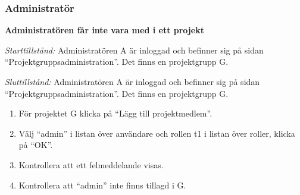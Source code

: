 \documentclass[a4paper]{article}
\begin{document}
\subsubsection{Administratör}
\begin{FT}
\item \textbf{Administratören får inte vara med i ett projekt}

\emph{Starttillstånd:} Administratören A är inloggad och befinner sig på sidan ``Projektgruppsadministration''. Det finns en projektgrupp G.

\emph{Sluttillstånd:} Administratören A är inloggad och befinner sig på sidan ``Projektgruppsadministration''. Det finns en projektgrupp G.

\begin{enumerate}
\item För projektet G klicka på ``Lägg till projektmedlem''.
\item Välj ``admin'' i listan över användare och rollen t1 i listan över roller, klicka på ``OK''.
\item Kontrollera att ett felmeddelande visas.
\item Kontrollera att ``admin'' inte finns tillagd i G.
\end{enumerate}


\end{FT}
\end{document}
